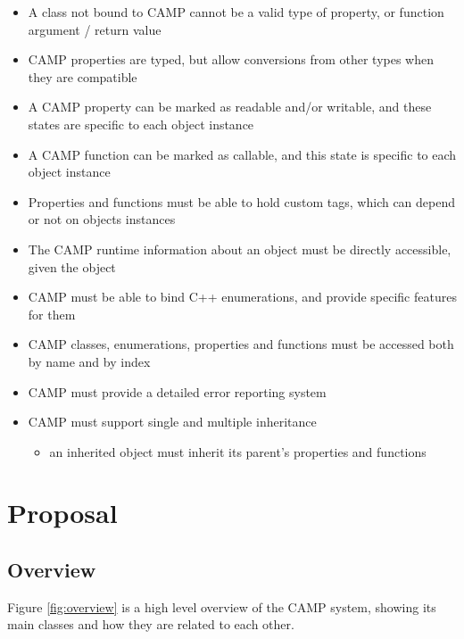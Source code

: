 \documentclass[a4paper, twoside]{report}
\begin{document}
\begin{itemize}
		\item A class not bound to CAMP cannot be a valid type of property, or function argument / return value
		\item CAMP properties are typed, but allow conversions from other types when they are compatible
		\item A CAMP property can be marked as readable and/or writable, and these states are specific to each object instance
		\item A CAMP function can be marked as callable, and this state is specific to each object instance
		\item Properties and functions must be able to hold custom tags, which can depend or not on objects instances
		\item The CAMP runtime information about an object must be directly accessible, given the object
		\item CAMP must be able to bind C++ enumerations, and provide specific features for them
		\item CAMP classes, enumerations, properties and functions must be accessed both by name and by index
		\item CAMP must provide a detailed error reporting system
		\item CAMP must support single and multiple inheritance
		\begin{itemize}
			\item an inherited object must inherit its parent's properties and functions
		\end{itemize}
	\end{itemize}

\chapter{Proposal}

\section{Overview}

	Figure \ref{fig:overview} is a high level overview of the CAMP system, showing its main classes and
	how they are related to each other.

\end{document}
